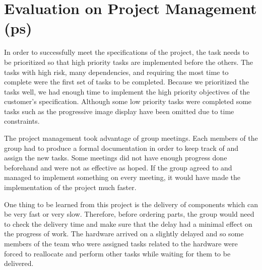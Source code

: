 \section{Evaluation on Project Management (ps)}

In order to successfully meet the specifications of the project, the task needs to be prioritized so that high priority tasks are implemented before the others.
The tasks with high risk, many dependencies, and requiring the most time to complete were the first set of tasks to be completed.
Because we prioritized the tasks well, we had enough time to implement the high priority objectives of the customer's specification.
Although some low priority tasks were completed some tasks such as the progressive image display have been omitted due to time constraints.

The project management took advantage of group meetings. Each members of the group had to produce a formal documentation in order to keep track of and assign the new tasks.
Some meetings did not have enough progress done beforehand and were not as effective as hoped.
If the group agreed to and managed to implement something on every meeting, it would have made the implementation of the project much faster. 

One thing to be learned from this project is the delivery of components which can be very fast or very slow. 
Therefore, before ordering parts, the group would need to check the delivery time and make sure that the delay had a minimal effect on the progress of work.
The hardware arrived on a slightly delayed and so some members of the team who were assigned tasks related to the hardware were forced to reallocate and perform other tasks while waiting for them to be delivered.